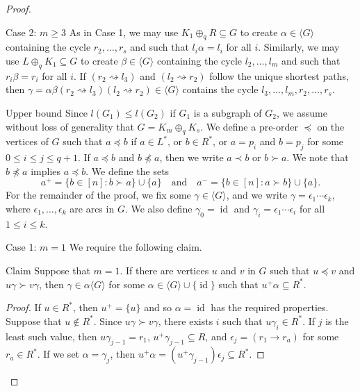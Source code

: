\documentclass[ALCO,ThmDefs,Unicode,epreuves]{cedram}
\DeclareMathOperator{\id}{id}
\newcommand{\genset}[1]{\langle#1\rangle}
\newcommand{\nset}{[n]}
\newenvironment{claim}{\begin{enonce}{Claim}}{\end{enonce}}
\begin{document}
\begin{proof}
\begin{enonce*}[remark]{Case 2: ${m \geq 3}$}
 As in Case 1, we may use $K_1 \oplus_q R\subseteq G$ to create
 $\alpha\in\genset{G}$ containing the cycle $r_2, \ldots, r_s$ and such that
 $l_i\alpha = l_i$ for all $i$. Similarly, we may use $L\oplus_q
 K_1\subseteq G$ to create $\beta\in\genset{G}$ containing the cycle
 $l_2, \ldots, l_m$ and such that $r_i\beta = r_i$ for all $i$. If 
 $(r_2 \rightsquigarrow l_3)$ and $(l_2
 \rightsquigarrow r_2)$ follow the unique shortest paths, then 
 $\gamma = \alpha \beta (r_2 \rightsquigarrow l_3) (l_2 \rightsquigarrow
 r_2)\in\genset{G}$ contains the cycle $l_3, \ldots, l_m, r_2, \ldots, r_s$.
\end{enonce*}

\begin{enonce*}[remark]{Upper bound} 
Since $l(G_1) \le l(G_2)$ if $G_1$ is a subgraph of $G_2$, we assume without
loss of generality that $G = K_m \oplus_q K_s$. 
We define a pre-order $\preceq$ on the vertices of $G$ such that 
$a \preceq b$ if $a \in L ^*$, or $b \in R ^ *$, or $a = p_i$ and $b= p_j$ for some
$0\leq i\leq j\leq q+1$. If $a\preceq b$ and $b\not\preceq a$, then we write
$a \prec b$ or $b\succ a$. We note that $b\not\preceq a$ implies $a\preceq b$. 
We define the sets
\[a^+ = \{b \in \nset : b \succ a \} \cup \{a\}\quad\text{and}\quad
a^- = \{b \in \nset : a \succ b \} \cup \{a\}.\]
For the remainder of the proof, we fix some $\gamma\in\genset{G}$, and we write $\gamma
= \epsilon_1 \cdots \epsilon_k$, where $\epsilon_1, \ldots, \epsilon_k$ are arcs
in $G$. We also define $\gamma_0 = \id$ and $\gamma_i = \epsilon_1 \cdots
\epsilon_i$ for all $1 \le i \le k$.
\end{enonce*}

\begin{enonce*}[remark]{Case 1: ${m = 1}$}
We require the following claim.
\end{enonce*}

\begin{claim} \label{claim:jumping1}
 Suppose that $m = 1$. If there are vertices $u$ and $v$ in $G$ such that
 $u\preceq v$ and $u\gamma \succ v\gamma$, then $\gamma \in \alpha \genset{G}$
 for some $\alpha \in \genset{G} \cup \{ \id \}$ such that $u^+ \alpha
 \subseteq R^*$.
\end{claim}

\begin{proof}
 If $u \in R^*$, then $u^+=\{u\}$ and so $\alpha = \id$ has the required
 properties. Suppose that $u \notin R^*$. Since $u \gamma \succ v \gamma$,
 there exists $i$ such that $u \gamma_i \in R ^ *$. If $j$ is the least such
 value, then $u \gamma_{j-1} = r_1$, $u^+ \gamma_{j-1} \subseteq R$, and
 $\epsilon_j = (r_1 \to r_a)$ for some $r_a \in R^*$. If we set $\alpha =
 \gamma_j$, then $u^+ \alpha = (u^+ \gamma_{j-1})\epsilon_j \subseteq R^*$.
\end{proof}


\end{proof}
\end{document}

